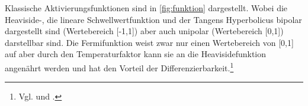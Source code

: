 Klassische Aktivierungsfunktionen sind in \autoref{fig:funktion} dargestellt. Wobei die \hbox{Heaviside-,} die lineare Schwellwertfunktion und der Tangens Hyperbolicus bipolar dargestellt sind (Wertebereich [-1,1]) aber auch unipolar (Wertebereich [0,1]) darstellbar sind. Die Fermifunktion weist zwar nur einen Wertebereich von [0,1] auf aber durch den Temperaturfaktor kann sie an die Heavisidefunktion angenährt werden und hat den Vorteil der Differenzierbarkeit.\footnote{Vgl. \citet[5]{neuralnet_intro} und \citet[39 f]{dkriesel07}.}

\begin{figure}[!htb]
    \centering
\end{figure}

